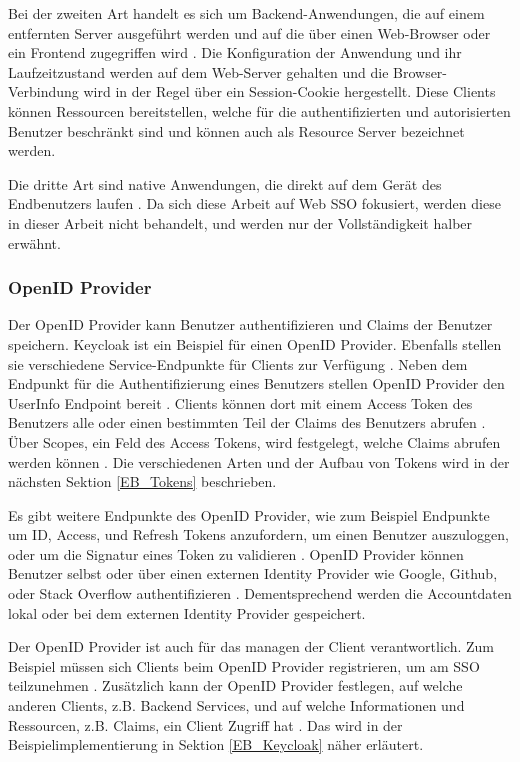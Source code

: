Bei der zweiten Art handelt es sich um Backend-Anwendungen, die auf einem entfernten Server ausgeführt werden und auf die über einen Web-Browser oder ein Frontend zugegriffen wird \cite{OAuth2inAction}. Die Konfiguration der Anwendung und ihr Laufzeitzustand werden auf dem Web-Server gehalten und die Browser-Verbindung wird in der Regel über ein Session-Cookie hergestellt. Diese Clients können Ressourcen bereitstellen, welche für die authentifizierten und autorisierten Benutzer beschränkt sind und können auch als Resource Server bezeichnet werden.

Die dritte Art sind native Anwendungen, die direkt auf dem Gerät des Endbenutzers laufen \cite{OAuth2inAction}. Da sich diese Arbeit auf Web SSO fokusiert, werden diese in dieser Arbeit nicht behandelt, und werden nur der Vollständigkeit halber erwähnt.

\subsubsection{OpenID Provider}

Der OpenID Provider kann Benutzer authentifizieren und Claims der Benutzer speichern. Keycloak ist ein Beispiel für einen OpenID Provider. Ebenfalls stellen sie verschiedene Service-Endpunkte für Clients zur Verfügung \cite{EB65}. Neben dem Endpunkt für die Authentifizierung eines Benutzers stellen OpenID Provider den UserInfo Endpoint bereit \cite{EB4} \cite{EB65}. Clients können dort mit einem Access Token des Benutzers alle oder einen bestimmten Teil der Claims des Benutzers abrufen \cite{EB4}. Über Scopes, ein Feld des Access Tokens, wird festgelegt, welche Claims abrufen werden können \cite{EB11}. Die verschiedenen Arten und der Aufbau von Tokens wird in der nächsten Sektion \ref{EB_Tokens} beschrieben.

Es gibt weitere Endpunkte des OpenID Provider, wie zum Beispiel Endpunkte um ID, Access, und Refresh Tokens anzufordern, um einen Benutzer auszuloggen, oder um die Signatur eines Token zu validieren \cite{EB65}. OpenID Provider können Benutzer selbst oder über einen externen Identity Provider wie Google, Github, oder Stack Overflow authentifizieren \cite{EB7} \cite{EB6}. Dementsprechend werden die Accountdaten lokal oder bei dem externen Identity Provider gespeichert.

Der OpenID Provider ist auch für das managen der Client verantwortlich. Zum Beispiel müssen sich Clients beim OpenID Provider registrieren, um am SSO teilzunehmen \cite{EB56} \cite{EB57}. Zusätzlich kann der OpenID Provider festlegen, auf welche anderen Clients, z.B. Backend Services, und auf welche Informationen und Ressourcen, z.B. Claims, ein Client Zugriff hat \cite{EB30} \cite{EB58}. Das wird in der Beispielimplementierung in Sektion \ref{EB_Keycloak} näher erläutert.


